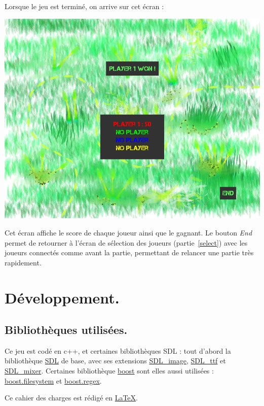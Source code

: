 \documentclass{article}
\begin{document}
Lorsque le jeu est terminé, on arrive sur cet écran :
\begin{center}
	\includegraphics[scale=0.4]{img/game_over.png}
\end{center}
Cet écran affiche le score de chaque joueur ainsi que le gagnant. Le bouton \emph{End} permet de retourner à l'écran de sélection des joueurs (partie~\ref{select}) avec les joueurs connectés comme avant la partie, permettant de relancer une partie très rapidement.

\section{Développement.}
\subsection{Bibliothèques utilisées.}
Ce jeu est codé en c++, et certaines bibliothèques SDL : tout d'abord la bibliothèque \href{http://www.libsdl.org/}{SDL} de base, avec ses extensions \href{http://www.libsdl.org/projects/SDL\_image/}{SDL\_image}, \href{http://www.libsdl.org/projects/SDL\_ttf/}{SDL\_ttf} et \href{http://www.libsdl.org/projects/SDL\_mixer/}{SDL\_mixer}. Certaines bibliothèque \href{http://www.boost.org/}{boost} sont elles aussi utilisées : \href{http://www.boost.org/doc/libs/1\_39\_0/libs/filesystem/doc/index.htm}{boost.filesystem} et \href{http://www.boost.org/doc/libs/1\_53\_0/libs/regex/doc/html/index.html}{boost.regex}.

Ce cahier des charges est rédigé en \href{http://www.latex-project.org/}{\LaTeX}.
\end{document}
